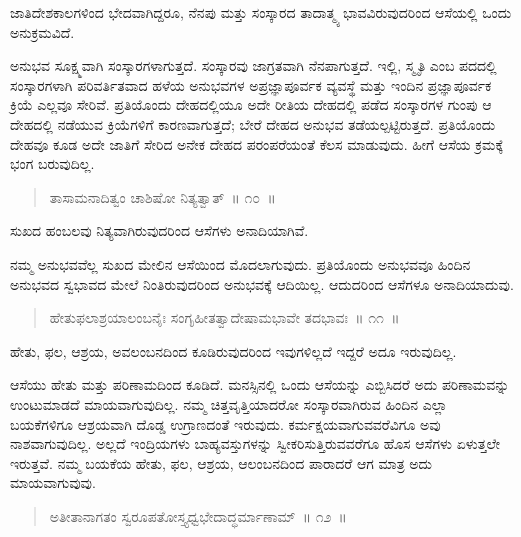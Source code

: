 \vspace{-0.3cm}

ಜಾತಿದೇಶಕಾಲಗಳಿಂದ ಭೇದವಾಗಿದ್ದರೂ, ನೆನಪು ಮತ್ತು ಸಂಸ್ಕಾರದ ತಾದಾತ್ಮ್ಯ ಭಾವವಿರುವುದರಿಂದ ಆಸೆಯಲ್ಲಿ ಒಂದು ಅನುಕ್ರಮವಿದೆ. 

ಅನುಭವ ಸೂಕ್ಷ್ಮವಾಗಿ ಸಂಸ್ಕಾರಗಳಾಗುತ್ತದೆ. ಸಂಸ್ಕಾರವು ಜಾಗ್ರತವಾಗಿ ನೆನಪಾಗುತ್ತದೆ. ಇಲ್ಲಿ, ಸ್ಮೃತಿ ಎಂಬ ಪದದಲ್ಲಿ ಸಂಸ್ಕಾರಗಳಾಗಿ ಪರಿವರ್ತಿತವಾದ ಹಳೆಯ ಅನುಭವಗಳ ಅಪ್ರಜ್ಞಾಪೂರ್ವಕ ವ್ಯವಸ್ಥೆ ಮತ್ತು ಇಂದಿನ ಪ್ರಜ್ಞಾಪೂರ್ವಕ ಕ್ರಿಯೆ ಎಲ್ಲವೂ ಸೇರಿವೆ. ಪ್ರತಿಯೊಂದು ದೇಹದಲ್ಲಿಯೂ ಅದೇ ರೀತಿಯ ದೇಹದಲ್ಲಿ ಪಡೆದ ಸಂಸ್ಕಾರಗಳ ಗುಂಪು ಆ ದೇಹದಲ್ಲಿ ನಡೆಯುವ ಕ್ರಿಯೆಗಳಿಗೆ ಕಾರಣವಾಗುತ್ತದೆ; ಬೇರೆ ದೇಹದ ಅನುಭವ ತಡೆಯಲ್ಪಟ್ಟಿರುತ್ತದೆ. ಪ್ರತಿಯೊಂದು ದೇಹವೂ ಕೂಡ ಅದೇ ಜಾತಿಗೆ ಸೇರಿದ ಅನೇಕ ದೇಹದ ಪರಂಪರೆಯಂತೆ ಕೆಲಸ ಮಾಡುವುದು. ಹೀಗೆ ಆಸೆಯ ಕ್ರಮಕ್ಕೆ ಭಂಗ ಬರುವುದಿಲ್ಲ. 

\vspace{-0.3cm}

\begin{verse}
ತಾಸಾಮನಾದಿತ್ವಂ ಚಾಶಿಷೋ ನಿತ್ಯತ್ವಾತ್​~॥ ೧೦~॥
\end{verse}

\vspace{-0.3cm}

ಸುಖದ ಹಂಬಲವು ನಿತ್ಯವಾಗಿರುವುದರಿಂದ ಆಸೆಗಳು ಅನಾದಿಯಾಗಿವೆ. 

ನಮ್ಮ ಅನುಭವವೆಲ್ಲ ಸುಖದ ಮೇಲಿನ ಆಸೆಯಿಂದ ಮೊದಲಾಗುವುದು. ಪ್ರತಿಯೊಂದು ಅನುಭವವೂ ಹಿಂದಿನ ಅನುಭವದ ಸ್ವಭಾವದ ಮೇಲೆ ನಿಂತಿರುವುದರಿಂದ ಅನುಭವಕ್ಕೆ ಆದಿಯಿಲ್ಲ. ಆದುದರಿಂದ ಆಸೆಗಳೂ ಅನಾದಿಯಾದುವು. 

\vspace{-0.3cm}

\begin{verse}
ಹೇತುಫಲಾಶ್ರಯಾಲಂಬನೈಃ ಸಂಗೃಹೀತತ್ವಾದೇಷಾಮಭಾವೇ ತದಭಾವಃ~॥ ೧೧~॥
\end{verse}

\vspace{-0.3cm}

ಹೇತು, ಫಲ, ಆಶ್ರಯ, ಅವಲಂಬನದಿಂದ ಕೂಡಿರುವುದರಿಂದ ಇವುಗಳಿಲ್ಲದೆ ಇದ್ದರೆ ಅದೂ ಇರುವುದಿಲ್ಲ. 

ಆಸೆಯು ಹೇತು ಮತ್ತು ಪರಿಣಾಮದಿಂದ ಕೂಡಿದೆ. ಮನಸ್ಸಿನಲ್ಲಿ ಒಂದು ಆಸೆಯನ್ನು ಎಬ್ಬಿಸಿದರೆ ಅದು ಪರಿಣಾಮವನ್ನು ಉಂಟುಮಾಡದೆ ಮಾಯವಾಗುವುದಿಲ್ಲ. ನಮ್ಮ ಚಿತ್ತವೃತ್ತಿಯಾದರೋ ಸಂಸ್ಕಾರವಾಗಿರುವ ಹಿಂದಿನ ಎಲ್ಲಾ ಬಯಕೆಗಳಿಗೂ ಆಶ್ರಯವಾಗಿ ದೊಡ್ಡ ಉಗ್ರಾಣದಂತೆ ಇರುವುದು. ಕರ್ಮಕ್ಷಯವಾಗುವವರೆವಿಗೂ ಅವು ನಾಶವಾಗುವುದಿಲ್ಲ. ಅಲ್ಲದೆ ಇಂದ್ರಿಯಗಳು ಬಾಹ್ಯವಸ್ತುಗಳನ್ನು ಸ್ವೀಕರಿಸುತ್ತಿರುವವರೆಗೂ ಹೊಸ ಆಸೆಗಳು ಏಳುತ್ತಲೇ ಇರುತ್ತವೆ. ನಮ್ಮ ಬಯಕೆಯ ಹೇತು, ಫಲ, ಆಶ್ರಯ, ಆಲಂಬನದಿಂದ ಪಾರಾದರೆ ಆಗ ಮಾತ್ರ ಅದು ಮಾಯವಾಗುವುವು. 

\vspace{-0.3cm}

\begin{verse}
ಅತೀತಾನಾಗತಂ ಸ್ವರೂಪತೋಸ್ತ್ಯಧ್ವಭೇದಾದ್ಧರ್ಮಾಣಾಮ್​~॥ ೧೨~॥
\end{verse}


